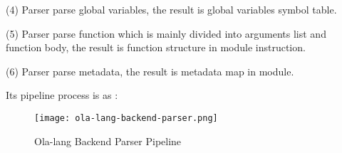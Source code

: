 \begin{itemize}
(4) Parser parse global variables, the result is global variables symbol table.

(5) Parser parse function which is mainly divided into arguments list and function body, the result is function structure in module instruction.

(6) Parser parse metadata, the result is metadata map in module.

Its pipeline process is as :
\begin{figure}[!htbp]
    \centering
    \texttt{[image: ola-lang-backend-parser.png]}
    \caption{Ola-lang Backend Parser Pipeline}
    \label{fig:ola-lang-backend-parser}
\end{figure}
\end{itemize}
